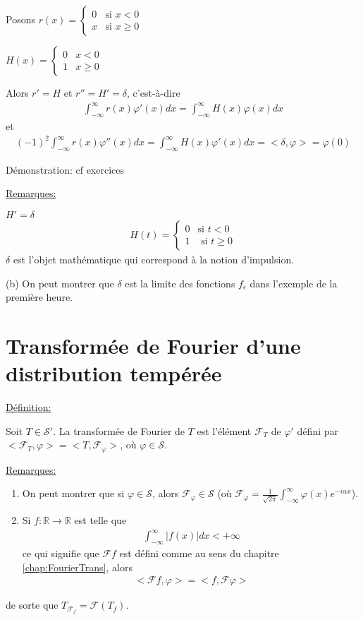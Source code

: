 Posons $r(x)=
\begin{cases}
	0&\text{si }x<0
	\\
	x&\text{si }x\geq0
\end{cases}$

$H(x)=
\begin{cases}
	0&x<0
	\\
	1&x\geq0
\end{cases}$

Alors $r'=H$ et $r''=H'=\delta$, c'est-à-dire
\begin{eqnarray*}
	\int_{-\infty}^{\infty}r(x)\varphi'(x)dx=\int_{-\infty}^{\infty}H(x)\varphi(x)dx
\end{eqnarray*}
et
\begin{eqnarray*}
	(-1)^2\int_{-\infty}^{\infty}r(x)\varphi''(x)dx=\int_{-\infty}^{\infty}H(x)\varphi'(x)dx=<\delta,\varphi>=\varphi(0)
\end{eqnarray*}

Démonstration: cf exercices

\underline{Remarques:}

$H'=\delta$
\begin{eqnarray*}
	H(t)=
	\begin{cases}
		0&\text{si }t<0
		\\
		1&\text{ si }t\geq0
	\end{cases}
\end{eqnarray*}
$\delta$ est l'objet mathématique qui correspond à la notion d'impulsion.

(b) On peut montrer que $\delta$ est la limite des fonctions $f_\epsilon$ dans l'exemple de la première heure.

\section{Transformée de Fourier d'une distribution tempérée}

\underline{Définition:}

Soit $T\in\mathcal S'$. La transformée de Fourier de $T$ est l'élément $\mathcal F_T$ de $\varphi'$ défini par $<\mathcal F_T,\varphi>=<T,\mathcal F_\varphi>$, où $\varphi\in\mathcal S$.

\underline{Remarques:}
\begin{enumerate}
	\item On peut montrer que si $\varphi\in\mathcal S$, alors $\mathcal F_\varphi\in\mathcal S$ (où $\mathcal F_\varphi=\frac{1}{\sqrt{2\pi}}\int_{-\infty}^{\infty}\varphi(x)e^{-i\alpha x}$).
	\item Si $f:\mathbb R\rightarrow\mathbb R$ est telle que
	\begin{eqnarray*}
		\int_{-\infty}^\infty|f(x)|dx<+\infty
	\end{eqnarray*}
	ce qui signifie que $\mathcal F f$ est défini comme au sens du chapitre \ref{chap:FourierTrans}, alors
	\begin{eqnarray}
		<\mathcal F f,\varphi>=<f,\mathcal F\varphi> 
	\end{eqnarray}
\end{enumerate}
de sorte que $T_{\mathcal F_f}=\mathcal F(T_f)$.

